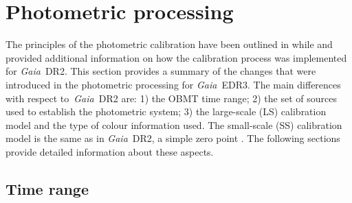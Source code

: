 \documentclass{aa}
\newcommand{\gaia}{\textit{Gaia}\xspace}
\newcommand{\drt}{\gaia~DR2\xspace}
\newcommand{\edr}{\gaia~EDR3\xspace}
\newcommand{\wrt}{with respect to}
\begin{document}
\section{Photometric processing}\label{sec:photsys}

The principles of the photometric calibration have been outlined in \cite{PhotCore} while \cite{Proc_DR2} and \cite{Phot_DR2} provided additional information on how the calibration process was implemented for \drt. This section provides a summary of the changes that were introduced in the photometric processing for \edr.
The main differences \wrt\ \drt are: 1) the OBMT time range; 2) the set of sources used to establish the photometric system; 3) the large-scale (LS) calibration model and the type of colour information used. The small-scale (SS) calibration model is the same as in \drt, a simple zero point \citep[see][]{Proc_DR2}. The following sections provide detailed information about these aspects.

\subsection{Time range}
\end{document}
